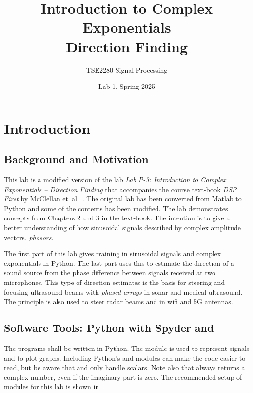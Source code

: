 


\logo

\title{Introduction to Complex Exponentials \\ Direction Finding} 
\author{TSE2280 Signal Processing}
\date{Lab 1, Spring 2025}
\maketitle

\thispagestyle{fancy}	

\section{Introduction}
\suppressfloats[t]
\subsection{Background and Motivation}
This lab is a modified version of the lab \emph{Lab P-3: Introduction to Complex Exponentials – Direction Finding}\cite{mcclellan_lab_2016} that accompanies the course text-book \emph{DSP First} by McClellan et~al.~\cite{mcclellan_dsp_2016}. The original lab has been converted from Matlab to Python and some of the contents has been modified. 
The lab demonstrates concepts from Chapters 2 and 3 in the text-book. The intention is to give a better understanding of how sinusoidal signals described by complex amplitude vectors, \emph{phasors}.

The first part of this lab gives training in sinusoidal signals and complex exponentials in Python. The last part uses this to estimate the direction of a sound source from the phase difference between signals received at two microphones. 
This type of direction estimates is the basis for steering and focusing ultrasound beams with \emph{phased arrays} in sonar and medical ultrasound. The principle is also used to steer radar beams and in wifi and 5G antennas.



\subsection{Software Tools: Python with Spyder and \jupyterlab}
The programs shall be written in Python. The module \numpy is used to represent signals and \matplotlib to plot graphs.
Including Python's \cmath and \rmath modules can make the code easier to read, but be aware that \cmath and \rmath only handle scalars. Note also that \cmath always returns a complex number, even if the imaginary part is zero. 
The recommended setup of modules for this lab is shown in 

